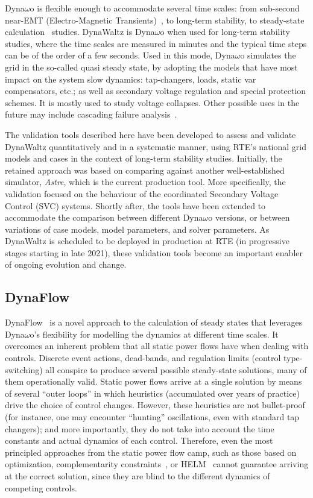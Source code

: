 \documentclass[conference]{IEEEtran}
\begin{document}
Dyna$\omega$o is flexible enough to accommodate several time scales: from sub-second
near-EMT (Electro-Magnetic Transients)~\cite{Masoon21}, to long-term stability,
to steady-state calculation~\cite{Cossart21} studies. DynaWaltz is Dyna$\omega$o when
used for long-term stability studies, where the time scales are measured in
minutes and the typical time steps can be of the order of a few seconds. Used in
this mode, Dyna$\omega$o simulates the grid in the so-called quasi steady state, by
adopting the models that have most impact on the system slow dynamics:
tap-changers, loads, static var compensators, etc.; as well as secondary voltage
regulation and special protection schemes. It is mostly used to study voltage
collapses. Other possible uses in the future may include cascading failure
analysis~\cite{Bialek16}.

The validation tools described here have been developed to assess and validate
DynaWaltz quantitatively and in a systematic manner, using RTE's national grid
models and cases in the context of long-term stability studies. Initially, the retained
approach was based on comparing against another well-established simulator,
\emph{Astre}, which is the current production tool. More specifically, the
validation focused on the behaviour of the coordinated Secondary Voltage
Control (SVC) systems. Shortly after, the tools have been extended to accommodate the
comparison between different Dyna$\omega$o versions, or between variations of case
models, model parameters, and solver parameters. As DynaWaltz is scheduled to be
deployed in production at RTE (in progressive stages starting in late 2021),
these validation tools become an important enabler of ongoing evolution and
change.



\subsection{DynaFlow}

DynaFlow~\cite{Cossart21} is a novel approach to the calculation of steady
states that leverages Dyna$\omega$o's flexibility for modelling the dynamics at
different time scales. It overcomes an inherent problem that all static power
flows have when dealing with controls.  Discrete event actions, dead-bands, and
regulation limits (control type-switching) all conspire to produce several
possible steady-state solutions, many of them operationally valid.  Static power
flows arrive at a single solution by means of several ``outer loops'' in which
heuristics (accumulated over years of practice) drive the choice of control
changes. However, these heuristics are not bullet-proof (for instance, one may
encounter ``hunting'' oscillations, even with standard tap changers); and more
importantly, they do not take into account the time constants and actual
dynamics of each control. Therefore, even the most principled approaches from
the static power flow camp, such as those based on optimization\cite{Ju20},
complementarity constraints~\cite{Murray15}, or HELM~\cite{Trias18} cannot
guarantee arriving at the correct solution, since they are blind to the
different dynamics of competing controls.
\end{document}
